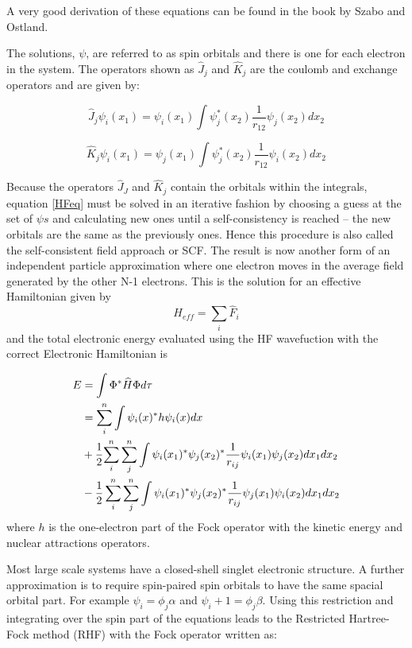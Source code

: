 A very good derivation of these equations can be found in the book by Szabo and Ostland.\cite{SzaboOstland}

The solutions, $\psi$, are referred to as spin orbitals and there is one for each electron in the system.  The operators shown as $\widehat{J}_j$ and $\widehat{K}_j$ are the coulomb and exchange operators and are given by:

\begin{equation}
\widehat{J}_j\psi_i(x_1) = \psi_i(x_1)\int{\psi_j^*(x_2)\frac{1}{r_{12}}\psi_j(x_2)dx_2}
\end{equation}

\begin{equation}
\widehat{K}_j\psi_i(x_1) = \psi_j(x_1)\int{\psi_j^*(x_2)\frac{1}{r_{12}}\psi_i(x_2)dx_2}
\end{equation}

Because the operators $\widehat{J}_J$ and $\widehat{K}_j$ contain the orbitals within the integrals, equation \ref{HFeq} must be solved in an iterative fashion by choosing a guess at the set of $\psi s$ and calculating new ones until a self-consistency is reached -- the new orbitals are the same as the previously ones.  Hence this procedure is also called the self-consistent field approach or SCF. The result is now another form of an independent particle approximation where one electron moves in the average field generated by the other N-1 electrons.  
This is the solution for an effective Hamiltonian given by
\begin{equation}
H_{eff}=\sum_i{\widehat{F}_i}
\end{equation}
and the total electronic energy evaluated using the HF wavefuction with the correct Electronic Hamiltonian is

\begin{align}
E & = \int{\Phi^* \widehat{H} \Phi d\tau } \notag \\
  & =  \sum_i^n{\int{\psi_i(x)^*h\psi_i(x)dx}} \notag \\
  & + \frac{1}{2}{\sum_i^n{\sum_j^n{\int{\psi_i(x_1)^*\psi_j(x_2)^*\frac{1}{r_{ij}}\psi_i(x_1)\psi_j(x_2)dx_1dx_2}}}} \\
  & - \frac{1}{2} \sum_i^n\sum_j^n{\int{\psi_i(x_1)^*\psi_j(x_2)^*\frac{1}{r_{ij}}\psi_j(x_1)\psi_i(x_2)dx_1dx_2}} \notag
\end{align}
where $h$ is the one-electron part of the Fock operator with the kinetic energy and nuclear attractions operators.

Most large scale systems have a closed-shell singlet electronic structure.  A further approximation is to require spin-paired spin orbitals to have the same spacial orbital part.  For example $\psi_i = \phi_j \alpha$ and $\psi_i+1 = \phi_j \beta $.  Using this restriction and integrating over the spin part of the equations leads to the Restricted Hartree-Fock method (RHF) with the Fock operator written as:

